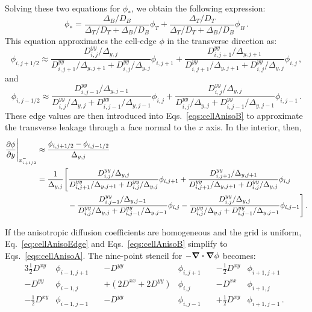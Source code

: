 Solving these two equations for $\phi_*$, we obtain the following expression:
\begin{equation}\label{eq:cellAnisoEdge}
  \phi_* = \frac{\Delta_B/D_B}{\Delta_T/D_T + \Delta_B/D_B} \phi_T
+ \frac{\Delta_T/D_T}{\Delta_T/D_T + \Delta_B/D_B} \phi_B \,.
\end{equation}
This equation approximates the cell-edge $\phi$ in the transverse direction as:
\begin{equation*}
  \phi_{i,j+1/2} \approx
  \frac{D_{i,j}^{yy} / \Delta_{y,j}}{D_{i,j+1}^{yy} / \Delta_{y,j+1} +
  D_{i,j}^{yy} / \Delta_{y,j}} \phi_{i,j+1}
+ \frac{D_{i,j+1}^{yy} / \Delta_{y,j+1}}{D_{i,j+1}^{yy} / \Delta_{y,j+1} +
D_{i,j}^{yy} / \Delta_{y,j}} \phi_{i,j} \,,
\end{equation*}
and
\begin{equation*}
  \phi_{i,j-1/2} \approx
  \frac{D_{i,j-1}^{yy} / \Delta_{y,j-1}}{D_{i,j}^{yy} / \Delta_{y,j} +
  D_{i,j-1}^{yy} / \Delta_{y,j-1}} \phi_{i,j}
+ \frac{D_{i,j}^{yy} / \Delta_{y,j}}{D_{i,j}^{yy} / \Delta_{y,j} +
D_{i,j-1}^{yy} / \Delta_{y,j-1}} \phi_{i,j-1} \,.
\end{equation*}
These edge values are then introduced into Eqs.~\eqref{eqs:cellAnisoB} to
approximate the transverse leakage through a face normal to the $x$ axis. In
the interior, then,
\begin{align*}
  \frac{\partial \phi}{\partial y} \Bigg|_{x_{i+1/2}^-} & \approx
  \frac{\phi_{i,j+1/2} - \phi_{i,j-1/2}}{\Delta_{y,j}}
  \\
  &= \frac{1}{\Delta_{y,j}} \Bigg[
  \frac{D_{i,j}^{yy} / \Delta_{y,j}}{D_{i,j+1}^{yy} / \Delta_{y,j+1} +
  D_{i,j}^{yy} / \Delta_{y,j}} \phi_{i,j+1}
+ \frac{D_{i,j+1}^{yy} / \Delta_{y,j+1}}{D_{i,j+1}^{yy} / \Delta_{y,j+1} +
D_{i,j}^{yy} / \Delta_{y,j}} \phi_{i,j}
\\
&\qquad\qquad -
  \frac{D_{i,j-1}^{yy} / \Delta_{y,j-1}}{D_{i,j}^{yy} / \Delta_{y,j} +
  D_{i,j-1}^{yy} / \Delta_{y,j-1}} \phi_{i,j}
- \frac{D_{i,j}^{yy} / \Delta_{y,j}}{D_{i,j}^{yy} / \Delta_{y,j} +
D_{i,j-1}^{yy} / \Delta_{y,j-1}} \phi_{i,j-1}
    \Bigg] \,.
\end{align*}


If the anisotropic diffusion coefficients are homogeneous and the grid is
uniform, Eq.~\eqref{eq:cellAnisoEdge} and Eqs.~\eqref{eqs:cellAnisoB} simplify
to Eqs.~\eqref{eqs:cellAnisoA}. The nine-point stencil for $-\bm{\nabla} \bm{\cdot} \bm{\nabla}
\phi$ becomes:
\begin{alignat*}{3}
  \tfrac{1}{2}D^{xy} & \phi_{i-1,j+1} \quad&
             -D^{yy} & \phi_{i,j+1} \quad&
 -\tfrac{1}{2}D^{xy} & \phi_{i+1,j+1}\quad
\\
             -D^{yy} & \phi_{i-1,j} &
 +\left( 2D^{xx} + 2D^{yy} \right) & \phi_{i,j} &
             -D^{xx} & \phi_{i+1,j}
\\
 -\tfrac{1}{2}D^{xy} & \phi_{i-1,j-1} &
             -D^{yy} & \phi_{i,j-1} \quad&
  +\tfrac{1}{2}D^{xy} & \phi_{i+1,j-1} \,.
\end{alignat*}

